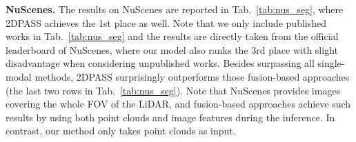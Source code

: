 \documentclass[runningheads]{llncs}
\begin{document}
	
	
	
	\noindent\textbf{NuScenes.}
The results on NuScenes are reported in Tab.~\ref{tab:nus_seg}, where 2DPASS achieves the 1st place as well.
Note that we only include published works in Tab.~\ref{tab:nus_seg} and the results are directly taken from the official leaderboard of NuScenes, where our model also ranks the 3rd place with slight disadvantage when considering unpublished works.
Besides surpassing all single-modal methods, 2DPASS surprisingly outperforms those fusion-based approaches (the last two rows in Tab.~\ref{tab:nus_seg}). 
Note that NuScenes provides images covering the whole FOV of the LiDAR, and fusion-based approaches achieve such results by using both point clouds and image features during the inference.
In contrast, our method only takes point clouds as input.
	
\end{document}
